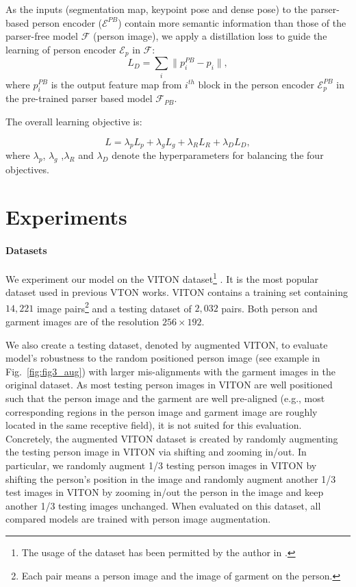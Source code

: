 \documentclass[10pt,twocolumn,letterpaper]{article}
\begin{document}
As the inputs (segmentation map, keypoint pose and dense pose) to the parser-based person encoder ($\mathcal{E}^{PB}$) contain more semantic information than those of the parser-free model $\mathcal{F}$ (person image), we apply a distillation loss to guide the learning of person encoder $\mathcal{E}_{p}$ in $\mathcal{F}$:
\begin{equation}
    L_{D} = \sum_{i} \lVert p_{i}^{PB} - p_{i}\rVert,
\end{equation}
where $p_{i}^{PB}$ is the output feature map from $i^{th}$ block in the person encoder $\mathcal{E}_{p}^{PB}$ in the pre-trained parser based model $\mathcal{F}_{PB}$.

The overall learning objective is:

\begin{equation}
    L = \lambda_{p}L_{p} + \lambda_{g}L_{g} + \lambda_{R}L_{R} + \lambda_{D}L_{D},
\end{equation}
where $\lambda_{p}$, $\lambda_{g}$ ,$\lambda_{R}$ and $\lambda_{D}$ denote the hyperparameters for balancing the four objectives.







\section{Experiments}

\paragraph{Datasets} We experiment our model on the VITON dataset\footnote{The usage of the dataset has been permitted by the author in \cite{han2018viton}.} \cite{han2018viton}. It is the most popular dataset used in previous VTON works. VITON contains a training set containing $14,221$ image pairs\footnote{Each pair means a person image and the image of garment on the person.} and a testing dataset of $2,032$ pairs. Both person and garment images are of the resolution $256 \times 192$. 

We also create a testing dataset, denoted by augmented VITON, to evaluate model's robustness to the random positioned person image (see example in Fig.~\ref{fig:fig3_aug}) with larger mis-alignments with the garment images in the original dataset. As most testing person images in VITON are well positioned such that the person image and the garment are well pre-aligned (e.g., most corresponding regions in the person image and garment image are roughly located in the same receptive field), it is not suited for this evaluation. Concretely, the augmented VITON dataset is created by randomly augmenting the testing person image in VITON via shifting and zooming in/out. In particular, we randomly augment 1/3 testing person images in VITON by shifting the person's position in the image and randomly augment another 1/3 test images in VITON by zooming in/out the person in the image and keep another 1/3 testing images unchanged. When evaluated on this dataset,  all compared models are trained with person image augmentation.
\end{document}
